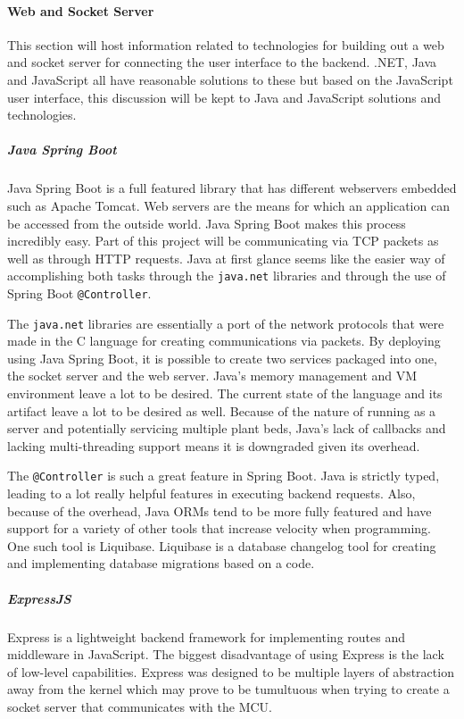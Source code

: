 \paragraph{Web and Socket Server}
This section will host information related to technologies for building out a web and socket server for connecting the user interface to the backend. .NET, Java and JavaScript all have reasonable solutions to these but based on the JavaScript user interface, this discussion will be kept to Java and JavaScript solutions and technologies.
\subparagraph{Java Spring Boot}
Java Spring Boot is a full featured library that has different webservers embedded such as Apache Tomcat. Web servers are the means for which an application can be accessed from the outside world. Java Spring Boot makes this process incredibly easy. Part of this project will be communicating via TCP packets as well as through HTTP requests. Java at first glance seems like the easier way of accomplishing both tasks through the \verb|java.net| libraries and through the use of Spring Boot \verb|@Controller|.

The \verb|java.net| libraries are essentially a port of the network protocols that were made in the C language for creating communications via packets. By deploying using Java Spring Boot, it is possible to create two services packaged into one, the socket server and the web server. Java's memory management and VM environment leave a lot to be desired. The current state of the language and its artifact leave a lot to be desired as well. Because of the nature of running as a server and potentially servicing multiple plant beds, Java's lack of callbacks and lacking multi-threading support means it is downgraded given its overhead.

The \verb|@Controller| is such a great feature in Spring Boot. Java is strictly typed, leading to a lot really helpful features in executing backend requests. Also, because of the overhead, Java ORMs tend to be more fully featured and have support for a variety of other tools that increase velocity when programming. One such tool is Liquibase. Liquibase is a database changelog tool for creating and implementing database migrations based on a code.

\subparagraph{ExpressJS}
Express is a lightweight backend framework for implementing routes and middleware in JavaScript. The biggest disadvantage of using Express is the lack of low-level capabilities. Express was designed to be multiple layers of abstraction away from the kernel which may prove to be tumultuous when trying to create a socket server that communicates with the MCU.
